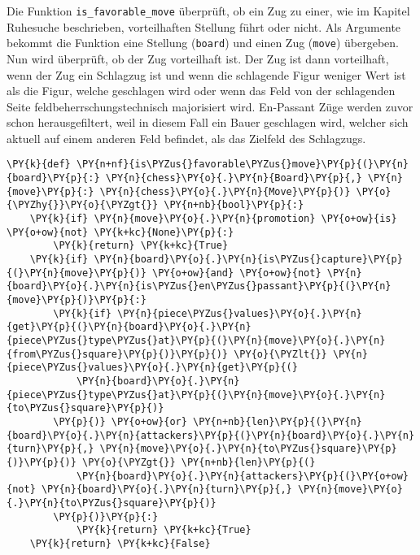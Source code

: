     Die Funktion \texttt{is\_favorable\_move} überprüft, ob ein Zug zu
einer, wie im Kapitel Ruhesuche beschrieben, vorteilhaften Stellung
führt oder nicht. Als Argumente bekommt die Funktion eine Stellung
(\texttt{board}) und einen Zug (\texttt{move}) übergeben. Nun wird
überprüft, ob der Zug vorteilhaft ist. Der Zug ist dann vorteilhaft,
wenn der Zug ein Schlagzug ist und wenn die schlagende Figur weniger
Wert ist als die Figur, welche geschlagen wird oder wenn das Feld von
der schlagenden Seite feldbeherrschungstechnisch majorisiert wird.
En-Passant Züge werden zuvor schon herausgefiltert, weil in diesem Fall
ein Bauer geschlagen wird, welcher sich aktuell auf einem anderen Feld
befindet, als das Zielfeld des Schlagzugs.

\bigskip

    \begin{tcolorbox}[fontupper=\linespread{.66}\selectfont, breakable, size=fbox, boxrule=1pt, pad at break*=1mm,colback=cellbackground, colframe=cellborder]
\begin{Verbatim}[commandchars=\\\{\}]
\PY{k}{def} \PY{n+nf}{is\PYZus{}favorable\PYZus{}move}\PY{p}{(}\PY{n}{board}\PY{p}{:} \PY{n}{chess}\PY{o}{.}\PY{n}{Board}\PY{p}{,} \PY{n}{move}\PY{p}{:} \PY{n}{chess}\PY{o}{.}\PY{n}{Move}\PY{p}{)} \PY{o}{\PYZhy{}}\PY{o}{\PYZgt{}} \PY{n+nb}{bool}\PY{p}{:}
    \PY{k}{if} \PY{n}{move}\PY{o}{.}\PY{n}{promotion} \PY{o+ow}{is} \PY{o+ow}{not} \PY{k+kc}{None}\PY{p}{:}
        \PY{k}{return} \PY{k+kc}{True}
    \PY{k}{if} \PY{n}{board}\PY{o}{.}\PY{n}{is\PYZus{}capture}\PY{p}{(}\PY{n}{move}\PY{p}{)} \PY{o+ow}{and} \PY{o+ow}{not} \PY{n}{board}\PY{o}{.}\PY{n}{is\PYZus{}en\PYZus{}passant}\PY{p}{(}\PY{n}{move}\PY{p}{)}\PY{p}{:}
        \PY{k}{if} \PY{n}{piece\PYZus{}values}\PY{o}{.}\PY{n}{get}\PY{p}{(}\PY{n}{board}\PY{o}{.}\PY{n}{piece\PYZus{}type\PYZus{}at}\PY{p}{(}\PY{n}{move}\PY{o}{.}\PY{n}{from\PYZus{}square}\PY{p}{)}\PY{p}{)} \PY{o}{\PYZlt{}} \PY{n}{piece\PYZus{}values}\PY{o}{.}\PY{n}{get}\PY{p}{(}
            \PY{n}{board}\PY{o}{.}\PY{n}{piece\PYZus{}type\PYZus{}at}\PY{p}{(}\PY{n}{move}\PY{o}{.}\PY{n}{to\PYZus{}square}\PY{p}{)}
        \PY{p}{)} \PY{o+ow}{or} \PY{n+nb}{len}\PY{p}{(}\PY{n}{board}\PY{o}{.}\PY{n}{attackers}\PY{p}{(}\PY{n}{board}\PY{o}{.}\PY{n}{turn}\PY{p}{,} \PY{n}{move}\PY{o}{.}\PY{n}{to\PYZus{}square}\PY{p}{)}\PY{p}{)} \PY{o}{\PYZgt{}} \PY{n+nb}{len}\PY{p}{(}
            \PY{n}{board}\PY{o}{.}\PY{n}{attackers}\PY{p}{(}\PY{o+ow}{not} \PY{n}{board}\PY{o}{.}\PY{n}{turn}\PY{p}{,} \PY{n}{move}\PY{o}{.}\PY{n}{to\PYZus{}square}\PY{p}{)}
        \PY{p}{)}\PY{p}{:}
            \PY{k}{return} \PY{k+kc}{True}
    \PY{k}{return} \PY{k+kc}{False}
\end{Verbatim}
\end{tcolorbox}

